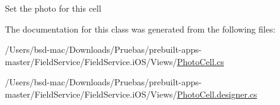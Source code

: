 Set the photo for this cell 



The documentation for this class was generated from the following files\+:\begin{DoxyCompactItemize}
\item 
/\+Users/bsd-\/mac/\+Downloads/\+Pruebas/prebuilt-\/apps-\/master/\+Field\+Service/\+Field\+Service.\+i\+O\+S/\+Views/\hyperlink{_photo_cell_8cs}{Photo\+Cell.\+cs}\item 
/\+Users/bsd-\/mac/\+Downloads/\+Pruebas/prebuilt-\/apps-\/master/\+Field\+Service/\+Field\+Service.\+i\+O\+S/\+Views/\hyperlink{_photo_cell_8designer_8cs}{Photo\+Cell.\+designer.\+cs}\end{DoxyCompactItemize}
